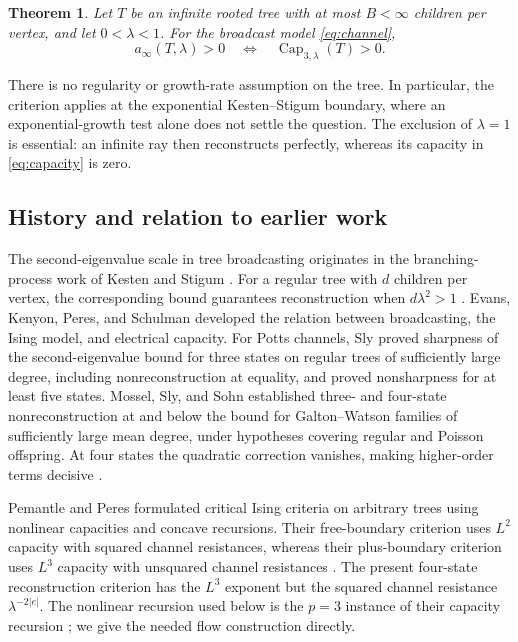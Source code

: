 \documentclass[11pt]{article}
\newtheorem{theorem}{Theorem}[section]
\numberwithin{equation}{section}
\newcommand{\Capacity}{\operatorname{Cap}}
\begin{document}
\begin{theorem}\label{thm:main}
Let $T$ be an infinite rooted tree with at most $B<\infty$
children per vertex, and let $0<\lambda<1$. For the broadcast
model \eqref{eq:channel},
\[
 a_\infty(T,\lambda)>0
 \quad\Longleftrightarrow\quad
 \Capacity_{3,\lambda}(T)>0.
\]
\end{theorem}

There is no regularity or growth-rate assumption on the tree.
In particular, the criterion applies at the exponential
Kesten--Stigum boundary, where an exponential-growth test alone
does not settle the question. The exclusion of $\lambda=1$ is
essential: an infinite ray then reconstructs perfectly, whereas
its capacity in \eqref{eq:capacity} is zero.

\subsection*{History and relation to earlier work}
The second-eigenvalue scale in tree broadcasting originates in
the branching-process work of Kesten and Stigum \cite{KS66}.
For a regular tree with $d$ children per vertex, the corresponding
bound guarantees reconstruction when $d\lambda^2>1$
\cite{MP03}. Evans, Kenyon, Peres, and Schulman
\cite{EKPS00} developed the relation between broadcasting, the
Ising model, and electrical capacity. For Potts channels, Sly
\cite{Sly11} proved sharpness of the second-eigenvalue bound for
three states on regular trees of sufficiently large degree,
including nonreconstruction at equality, and proved nonsharpness
for at least five states. Mossel, Sly, and Sohn \cite{MSS25}
established three- and four-state nonreconstruction at and below
the bound for Galton--Watson families of sufficiently large mean
degree, under hypotheses covering regular and Poisson offspring.
At four states the quadratic correction vanishes, making
higher-order terms decisive \cite{Sly11,MSS25}.

Pemantle and Peres \cite{PP10} formulated critical Ising criteria
on arbitrary trees using nonlinear capacities and concave
recursions. Their free-boundary criterion uses $L^2$ capacity
with squared channel resistances, whereas their plus-boundary
criterion uses $L^3$ capacity with unsquared channel resistances
\cite[Theorems~2.1--2.2]{PP10}. The present four-state
reconstruction criterion has the $L^3$ exponent but the squared
channel resistance $\lambda^{-2|e|}$. The nonlinear recursion
used below is the $p=3$ instance of their capacity recursion
\cite[Lemma~3.1 and Corollary~3.4]{PP10}; we give the needed
flow construction directly.
\end{document}
